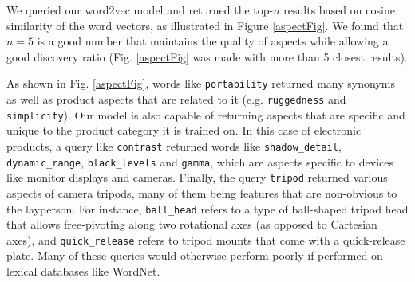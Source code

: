 \documentclass{article} %
\begin{document}
We queried our word2vec model and returned the top-$n$ results based on cosine similarity of the word vectors, as illustrated in Figure \ref{aspectFig}. We found that $n=5$ is a good number that maintains the quality of aspects while allowing a good discovery ratio (Fig. \ref{aspectFig} was made with more than 5 closest results).

As shown in Fig. \ref{aspectFig}, words like \texttt{portability} returned many synonyms as well as product aspects that are related to it (e.g. \texttt{ruggedness} and \texttt{simplicity}). Our model is also capable of returning aspects that are specific and unique to the product category it is trained on. In this case of electronic products, a query like \texttt{contrast} returned words like \texttt{shadow\_detail}, \texttt{dynamic\_range}, \texttt{black\_levels} and \texttt{gamma}, which are aspects specific to devices like monitor displays and cameras. Finally, the query \texttt{tripod} returned various aspects of camera tripods, many of them being features that are non-obvious to the layperson. For instance, \texttt{ball\_head} refers to a type of ball-shaped tripod head that allows free-pivoting along two rotational axes (as opposed to Cartesian axes), and \texttt{quick\_release} refers to tripod mounts that come with a quick-release plate. Many of these queries would otherwise perform poorly if performed on lexical databases like WordNet.




\end{document}
